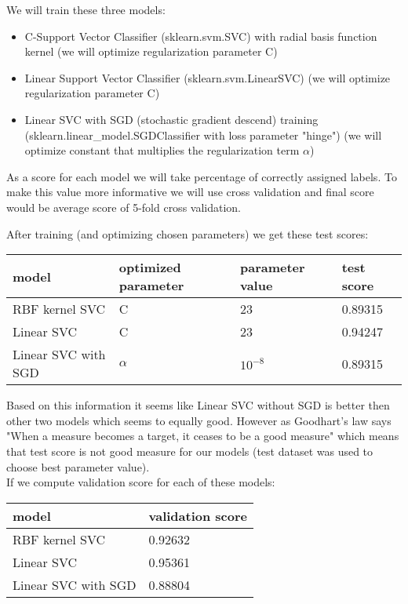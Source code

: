 \documentclass[a4paper]{article}
\begin{document}
	We will train these three models:
	\begin{itemize}
		\item C-Support Vector Classifier (sklearn.svm.SVC) with radial basis function kernel (we will optimize regularization parameter C)
		\item Linear Support Vector Classifier (sklearn.svm.LinearSVC) (we will optimize regularization parameter C)
		\item Linear SVC with SGD (stochastic gradient descend) training (sklearn.linear\_model.SGDClassifier with loss parameter "hinge") (we will optimize constant that multiplies the regularization term $\alpha$)
	\end{itemize}

	As a score for each model we will take percentage of correctly assigned labels. To make this value more informative we will use cross validation and final score would be average score of 5-fold cross validation.
	
	After training (and optimizing chosen parameters) we get these test scores:
	
		\begin{table}[!h]
			\begin{tabular}{|l|l|l|l|}
				\hline
				model & optimized parameter & parameter value & test score  \\ \hline
				RBF kernel SVC & C & 23 & 0.89315 \\ \hline
				Linear SVC & C & 23 & 0.94247 \\ \hline
				Linear SVC with SGD& $\alpha$ & $10^{-8}$ & 0.89315 \\ \hline
			\end{tabular}
	\end{table} 

	Based on this information it seems like Linear SVC without SGD is better then other two models which seems to equally good. However as Goodhart's law says "When a measure becomes a target, it ceases to be a good measure" which means that test score is not good measure for our models (test dataset was used to choose best parameter value). 
	\\
	
	If we compute validation score for each of these models:
	
	\begin{table}[!h]
		\begin{tabular}{|l|l|}
			\hline
			model &  validation score  \\ \hline
			RBF kernel SVC & 0.92632 \\ \hline
			Linear SVC & 0.95361 \\ \hline
			Linear SVC with SGD &  0.88804 \\ \hline
		\end{tabular}
	\end{table} 
\end{document}
